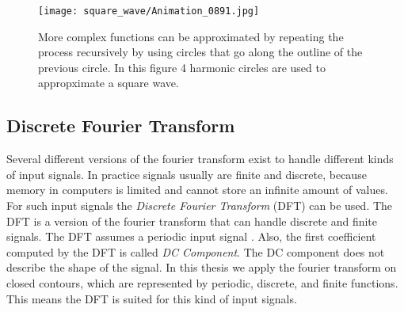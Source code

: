 \documentclass[thesis.tex]{subfiles}
\begin{document}
%
%

\begin{figure}[h]
\centering
\texttt{[image: square\_wave/Animation\_0891.jpg]}
\caption{More complex functions can be approximated by repeating the process recursively by using circles that go along the outline of the previous circle. In this figure 4 harmonic circles are used to appropximate a square wave.}
\label{fig:fourier_square}
\end{figure}

\subsection{Discrete Fourier Transform}
Several different versions of the fourier transform exist to handle different kinds of input signals. In practice signals usually are finite and discrete, because memory in computers is limited and cannot store an infinite amount of values. For such input signals the \textit{Discrete Fourier Transform} (DFT) can be used. The DFT is a version of the fourier transform that can handle discrete and finite signals. The DFT assumes a periodic input signal \cite{dspguide}. Also, the first coefficient computed by the DFT is called \textit{DC Component}. The DC component does not describe the shape of the signal. In this thesis we apply the fourier transform on closed contours, which are represented by periodic, discrete, and finite functions. This means the DFT is suited for this kind of input signals.
\end{document}
